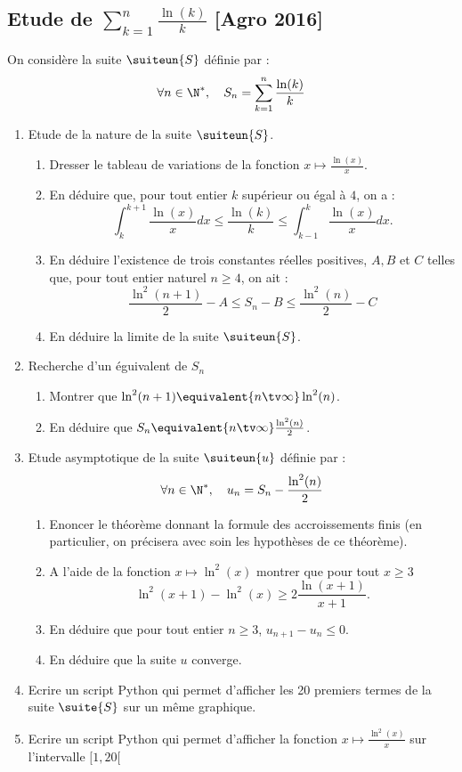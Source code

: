 \subsection{Etude de $\sum_{k=1}^n \frac{\ln(k)}{k}$ [Agro 2016]}

\begin{probleme}
On considère la suite $\suiteun{S}$ définie par :
$$\forall n\in \N^*, \quad S_n  =\sum_{k=1}^n \frac{\ln(k)}{k}$$

\begin{enumerate}
\item Etude de la nature de la suite $\suiteun{S}$.
\begin{enumerate}
\item Dresser le tableau  de variations de la fonction $x\mapsto \frac{\ln(x)}{x}$.
\item En déduire que, pour tout entier $k$ supérieur ou égal à $4$, on a : 
$$\int_k^{k+1} \frac{\ln(x)}{x}dx\leq \frac{\ln(k)}{k} \leq \int_{k-1}^{k} \frac{\ln(x)}{x}dx.$$
\item En déduire l'existence de trois constantes réelles positives, $A,B $ et $C$ telles que, pour tout entier naturel $n\geq 4$, on ait : 
$$\frac{\ln^2(n+1)}{2} -A\leq S_n-B \leq \frac{\ln^2(n)}{2} -C$$
\item En déduire la limite de la suite $\suiteun{S}$. 
\end{enumerate}
\item Recherche d'un éguivalent de $S_n$
\begin{enumerate}
\item Montrer que $\ln^2(n+1) \equivalent{n\tv \infty} \ln^2(n)$.
\item En déduire que $S_n\equivalent{n\tv \infty} \frac{\ln^2(n)}{2}$.
\end{enumerate}
\item Etude asymptotique de la suite $\suiteun{u}$ définie par : 
$$\forall n\in \N^*, \quad u_n=S_n -\frac{\ln^2(n)}{2}$$
\begin{enumerate}
\item Enoncer le théorème donnant la formule des accroissements finis (en particulier, on précisera avec soin les hypothèses de ce théorème).
\item A l'aide de la fonction $x \mapsto \ln^2(x) $   montrer que  pour tout $x\geq 3$
$$\ln^2(x+1) -\ln^2(x) \geq 2\frac{\ln(x+1)}{x+1}.$$
\item En déduire  que pour tout entier $n\geq 3$, $u_{n+1} -u_n \leq 0$.
\item En déduire que la suite $u$ converge. 
\end{enumerate}
\item Ecrire un script Python qui permet d'afficher les 20 premiers termes de la suite $\suite{S}$ sur un même graphique. 
\item Ecrire  un script Python qui permet d'afficher la fonction $x\mapsto \frac{\ln^2(x)}{x}$ sur l'intervalle $[1,20[$


\end{enumerate}
\end{probleme}
